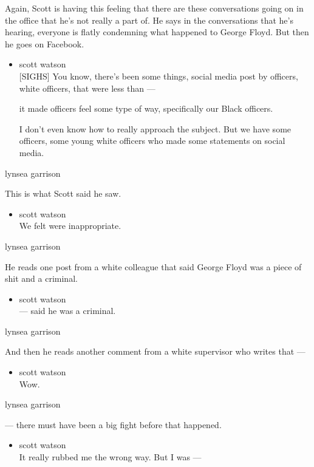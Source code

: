 Again, Scott is having this feeling that there are these conversations
going on in the office that he's not really a part of. He says in the
conversations that he's hearing, everyone is flatly condemning what
happened to George Floyd. But then he goes on Facebook.

\begin{itemize}
\item
  scott watson\\
  {[}SIGHS{]} You know, there's been some things, social media post by
  officers, white officers, that were less than ---

  it made officers feel some type of way, specifically our Black
  officers.

  I don't even know how to really approach the subject. But we have some
  officers, some young white officers who made some statements on social
  media.
\end{itemize}

lynsea garrison

This is what Scott said he saw.

\begin{itemize}
\tightlist
\item
  scott watson\\
  We felt were inappropriate.
\end{itemize}

lynsea garrison

He reads one post from a white colleague that said George Floyd was a
piece of shit and a criminal.

\begin{itemize}
\tightlist
\item
  scott watson\\
  --- said he was a criminal.
\end{itemize}

lynsea garrison

And then he reads another comment from a white supervisor who writes
that ---

\begin{itemize}
\tightlist
\item
  scott watson\\
  Wow.
\end{itemize}

lynsea garrison

--- there must have been a big fight before that happened.

\begin{itemize}
\tightlist
\item
  scott watson\\
  It really rubbed me the wrong way. But I was ---
\end{itemize}

